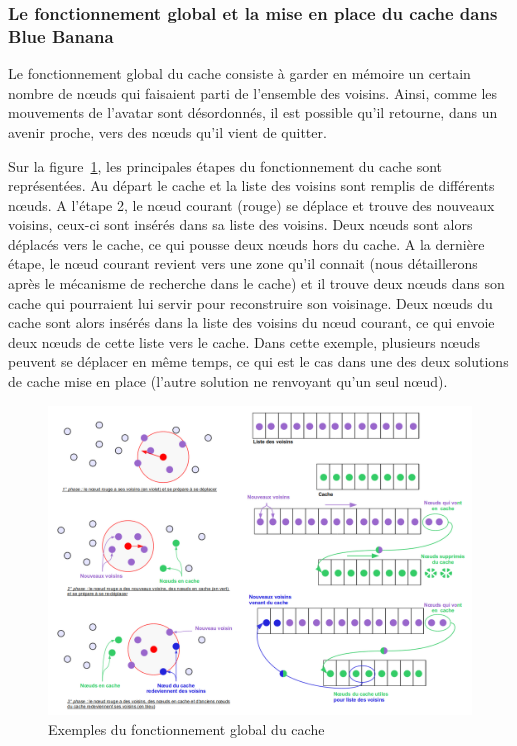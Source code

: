 \subsubsection{Le fonctionnement global et la mise en place du cache dans Blue Banana}
Le fonctionnement global du cache consiste à garder en mémoire un certain nombre de nœuds qui faisaient parti de l'ensemble des voisins. Ainsi, comme les mouvements de l'avatar sont désordonnés, il est possible qu'il retourne, dans un avenir proche, vers des nœuds qu'il vient de quitter. 
\par Sur la figure~\ref{cacheW}, les principales étapes du fonctionnement du cache sont représentées. Au départ le cache et la liste des voisins sont remplis de différents nœuds. A l'étape 2, le nœud courant (rouge) se déplace et trouve des nouveaux voisins, ceux-ci sont insérés dans sa liste des voisins. Deux nœuds sont alors déplacés vers le cache, ce qui pousse deux nœuds hors du cache. A la dernière étape, le nœud courant revient vers une zone qu'il connait (nous détaillerons après le mécanisme de recherche dans le cache) et il trouve deux nœuds dans son cache qui pourraient lui servir pour reconstruire son voisinage. Deux nœuds du cache sont alors insérés dans la liste des voisins du nœud courant, ce qui envoie deux nœuds de cette liste vers le cache. Dans cette exemple, plusieurs nœuds peuvent se déplacer en même temps, ce qui est le cas dans une des deux solutions de cache mise en place (l'autre solution ne renvoyant qu'un seul nœud).
	\begin{figure}[!h]
        \centering
        \includegraphics[scale=0.35]{./Ressources/Images/cacheWextends.png}
        \caption{Exemples du fonctionnement global du cache}
        \label{cacheW}
        \end{figure} 
